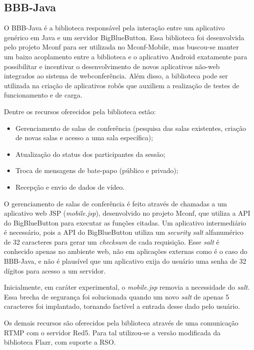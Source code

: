 \documentclass{acm_proc_article-sp}
\begin{document}
\subsection{BBB-Java}

O BBB-Java é a biblioteca responsável pela interação entre um aplicativo genérico em Java e um servidor BigBlueButton. Essa biblioteca foi desenvolvida pelo projeto Mconf para ser utilizada no Mconf-Mobile, mas buscou-se manter um baixo acoplamento entre a biblioteca e o aplicativo Android exatamente para possibilitar e incentivar o desenvolvimento de novos aplicativos não-web integrados ao sistema de webconferência. Além disso, a biblioteca pode ser utilizada na criação de aplicativos robôs que auxiliem a realização de testes de funcionamento e de carga.

Dentre os recursos oferecidos pela biblioteca estão:
\begin{itemize}
 \item Gerenciamento de salas de conferência (pesquisa das salas existentes, criação de novas salas e acesso a uma sala específica);
 \item Atualização do status dos participantes da sessão;
 \item Troca de mensagens de bate-papo (público e privado);
 \item Recepção e envio de dados de vídeo.
\end{itemize}

O gerenciamento de salas de conferência é feito através de chamadas a um aplicativo web JSP (\emph{mobile.jsp}), desenvolvido no projeto Mconf, que utiliza a API do BigBlueButton para executar as funções citadas. Um aplicativo intermediário é necessário, pois a API do BigBlueButton utiliza um \emph{security salt} alfanumérico de 32 caracteres para gerar um \emph{checksum} de cada requisição. Esse \emph{salt} é conhecido apenas no ambiente web, não em aplicações externas como é o caso do BBB-Java, e não é plausível que um aplicativo exija do usuário uma senha de 32 dígitos para acesso a um servidor.

Inicialmente, em caráter experimental, o \emph{mobile.jsp} removia a necessidade do \emph{salt}. Essa brecha de segurança foi solucionada quando um novo \emph{salt} de apenas 5 caracteres foi implantado, tornando factível a entrada desse dado pelo usuário.

Os demais recursos são oferecidos pela biblioteca através de uma comunicação RTMP com o servidor Red5. Para tal utilizou-se a versão modificada da biblioteca Flazr, com suporte a RSO.
\end{document}
